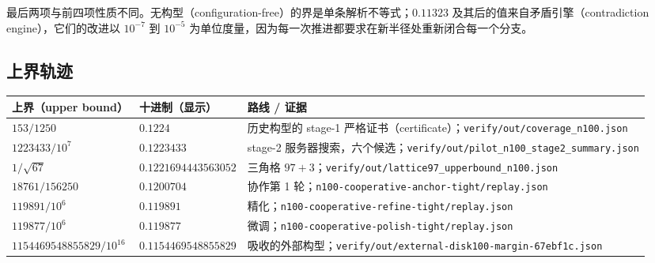 最后两项与前四项性质不同。无构型（configuration-free）的界是单条解析不等式；$0.11323$ 及其后的值来自矛盾引擎（contradiction engine），它们的改进以 $10^{-7}$ 到 $10^{-5}$ 为单位度量，因为每一次推进都要求在新半径处重新闭合每一个分支。

\subsection{上界轨迹}

\begin{center}
\footnotesize
\begin{tabular}{@{}>{\raggedright\arraybackslash}p{}>{\raggedright\arraybackslash}p{}>{\raggedright\arraybackslash}p{}@{}}
\toprule
上界（upper bound） & 十进制（显示） & 路线 / 证据 \\
\midrule
$153/1250$ & $0.1224$ & 历史构型的 stage-1 严格证书（certificate）；\texttt{verify/\allowbreak{}out/\allowbreak{}coverage\_\allowbreak{}n100.json} \\
$1223433/10^{7}$ & $0.1223433$ & stage-2 服务器搜索，六个候选；\texttt{verify/\allowbreak{}out/\allowbreak{}pilot\_\allowbreak{}n100\_\allowbreak{}stage2\_\allowbreak{}summary.json} \\
$1/\sqrt{67}$ & $0.1221694443563052$ & 三角格 $97{+}3$；\texttt{verify/\allowbreak{}out/\allowbreak{}lattice97\_\allowbreak{}upperbound\_\allowbreak{}n100.json} \\
$18761/156250$ & $0.1200704$ & 协作第 1 轮；\texttt{n100-\allowbreak{}cooperative-\allowbreak{}anchor-\allowbreak{}tight/\allowbreak{}replay.json} \\
$119891/10^{6}$ & $0.119891$ & 精化；\texttt{n100-\allowbreak{}cooperative-\allowbreak{}refine-\allowbreak{}tight/\allowbreak{}replay.json} \\
$119877/10^{6}$ & $0.119877$ & 微调；\texttt{n100-\allowbreak{}cooperative-\allowbreak{}polish-\allowbreak{}tight/\allowbreak{}replay.json} \\
$1154469548855829/10^{16}$ & $\mathbf{0.1154469548855829}$ & 吸收的外部构型；\texttt{verify/\allowbreak{}out/\allowbreak{}external-\allowbreak{}disk100-\allowbreak{}margin-\allowbreak{}67ebf1c.\allowbreak{}json} \\
\bottomrule
\end{tabular}
\end{center}

